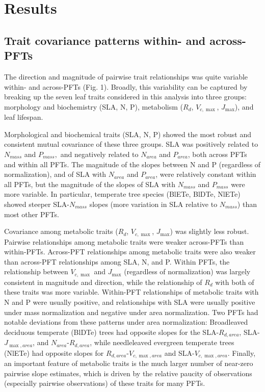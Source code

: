 \documentclass{article}
\begin{document}
\section{Results}

\subsection{Trait covariance patterns within- and across-PFTs}

The direction and magnitude of pairwise trait relationships was quite variable within- and across-PFTs (Fig. 1).
Broadly, this variability can be captured by breaking up the seven leaf traits considered in this analysis into three groups:
morphology and biochemistry (SLA, N, P),
metabolism ($R_d$, $V_{c,\max}$, $J_{\max}$),
and leaf lifespan.

Morphological and biochemical traits (SLA, N, P) showed the most robust and consistent mutual covariance of these three groups.
SLA was positively related to $N_{mass}$ and $P_{mass},$ and negatively related to $N_{area}$ and $P_{area}$, both across PFTs and within all PFTs.
The magnitude of the slopes between N and P (regardless of normalization), and of SLA with $N_{area}$ and $P_{area}$, were relatively constant within all PFTs,
but the magnitude of the slopes of SLA with $N_{mass}$ and $P_{mass}$ were more variable.
In particular, temperate tree species (BlETe, BlDTe, NlETe) showed steeper SLA-$N_{mass}$ slopes (more variation in SLA relative to $N_{mass}$) than most other PFTs.

Covariance among metabolic traits ($R_d$, $V_{c,\max}$, $J_{\max}$) was slightly less robust.
Pairwise relationships among metabolic traits were weaker across-PFTs than within-PFTs.
Across-PFT relationships among metabolic traits were also weaker than across-PFT relationships among SLA, N, and P.
Within PFTs, the relationship between $V_{c,\max}$ and $J_{\max}$ (regardless of normalization) was largely consistent in magnitude and direction,
while the relationship of $R_d$ with both of these traits was more variable.
Within-PFT relationships of metabolic traits with N and P were usually positive,
and relationships with SLA were usually positive under mass normalization and negative under area normalization.
Two PFTs had notable deviations from these patterns under area normalization:
Broadleaved deciduous temperate (BlDTe) trees had opposite slopes for the SLA-$R_{d,area}$, SLA-$J_{\max,area}$, and $N_{area}$-$R_{d,area}$,
while needleleaved evergreen temperate trees (NlETe) had opposite slopes for $R_{d,area}$-$V_{c,\max,area}$ and SLA-$V_{c,\max,area}$.
Finally, an important feature of metabolic traits is the much larger number of near-zero pairwise slope estimates,
which is driven by the relative paucity of observations (especially pairwise observations) of these traits for many PFTs.
\end{document}
